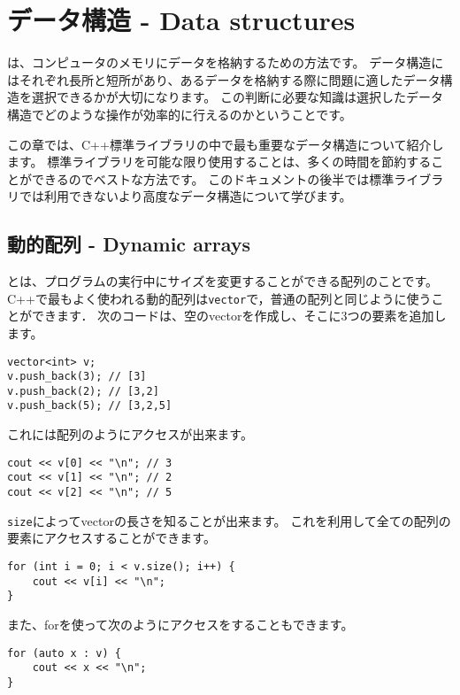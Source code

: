 \chapter{データ構造 - Data structures}


は、コンピュータのメモリにデータを格納するための方法です。
データ構造にはそれぞれ長所と短所があり、あるデータを格納する際に問題に適したデータ構造を選択できるかが大切になります。
この判断に必要な知識は選択したデータ構造でどのような操作が効率的に行えるのかということです。

この章では、C++標準ライブラリの中で最も重要なデータ構造について紹介します。
標準ライブラリを可能な限り使用することは、多くの時間を節約することができるのでベストな方法です。
このドキュメントの後半では標準ライブラリでは利用できないより高度なデータ構造について学びます。

\section{動的配列 - Dynamic arrays}


とは、プログラムの実行中にサイズを変更することができる配列のことです。
C++で最もよく使われる動的配列は\texttt{vector}で，普通の配列と同じように使うことができます．
次のコードは、空のvectorを作成し、そこに3つの要素を追加します。

\begin{lstlisting}
vector<int> v;
v.push_back(3); // [3]
v.push_back(2); // [3,2]
v.push_back(5); // [3,2,5]
\end{lstlisting}

これには配列のようにアクセスが出来ます。
\begin{lstlisting}
cout << v[0] << "\n"; // 3
cout << v[1] << "\n"; // 2
cout << v[2] << "\n"; // 5
\end{lstlisting}

\texttt{size}によってvectorの長さを知ることが出来ます。
これを利用して全ての配列の要素にアクセスすることができます。
\begin{lstlisting}
for (int i = 0; i < v.size(); i++) {
    cout << v[i] << "\n";
}
\end{lstlisting}

\begin{samepage}

また、forを使って次のようにアクセスをすることもできます。
\begin{lstlisting}
for (auto x : v) {
    cout << x << "\n";
}
\end{lstlisting}
\end{samepage}

